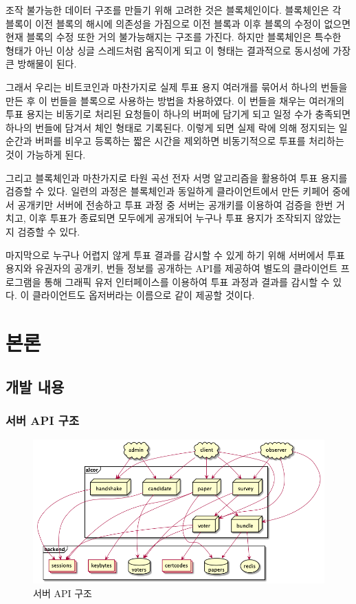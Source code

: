\documentclass[10pt,a4paper,left=15mm,right=15mm,top=20mm,bottom=20mm]{article}
\begin{document}
조작 불가능한 데이터 구조를 만들기 위해 고려한 것은 블록체인이다. 블록체인은 각 블록이 이전 블록의 해시에 의존성을 가짐으로 이전 블록과 이후 블록의 수정이 없으면 현재 블록의 수정 또한 거의 불가능해지는 구조를 가진다. 하지만 블록체인은 특수한 형태가 아닌 이상 싱글 스레드처럼 움직이게 되고 이 형태는 결과적으로 동시성에 가장 큰 방해물이 된다.

그래서 우리는 비트코인과 마찬가지로 실제 투표 용지 여러개를 묶어서 하나의 번들을 만든 후 이 번들을 블록으로 사용하는 방법을 차용하였다. 이 번들을 채우는 여러개의 투표 용지는 비동기로 처리된 요청들이 하나의 버퍼에 담기게 되고 일정 수가 충족되면 하나의 번들에 담겨서 체인 형태로 기록된다. 이렇게 되면 실제 락에 의해 정지되는 일순간과 버퍼를 비우고 등록하는 짧은 시간을 제외하면 비동기적으로 투표를 처리하는 것이 가능하게 된다.

그리고 블록체인과 마찬가지로 타원 곡선 전자 서명 알고리즘을 활용하여 투표 용지를 검증할 수 있다. 일련의 과정은 블록체인과 동일하게 클라이언트에서 만든 키페어 중에서 공개키만 서버에 전송하고 투표 과정 중 서버는 공개키를 이용하여 검증을 한번 거치고, 이후 투표가 종료되면 모두에게 공개되어 누구나 투표 용지가 조작되지 않았는 지 검증할 수 있다.

마지막으로 누구나 어렵지 않게 투표 결과를 감시할 수 있게 하기 위해 서버에서 투표 용지와 유권자의 공개키, 번들 정보를 공개하는 API를 제공하여 별도의 클라이언트 프로그램을 통해 그래픽 유저 인터페이스를 이용하여 투표 과정과 결과를 감시할 수 있다. 이 클라이언트도 옵저버라는 이름으로 같이 제공할 것이다.

\section{본론}

\subsection{개발 내용}

\subsubsection{서버 API 구조}

\begin{figure}[h]
    \begin{center}
        \includegraphics[width=13cm]{server}
        \caption{서버 API 구조}
    \end{center}
\end{figure}
\end{document}
